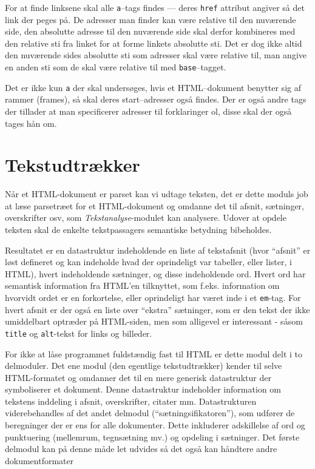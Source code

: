\documentclass[a4paper,oneside,article, titlepage]{memoir}
\begin{document}
For at finde linksene skal alle \texttt{a}--tags findes --- deres
\texttt{href} attribut angiver så det link der peges på. De adresser
man finder kan være relative til den nuværende side, den absolutte
adresse til den nuværende side skal derfor kombineres med den relative
sti fra linket for at forme linkets absolutte sti. Det er dog ikke
altid den nuværende sides absolutte sti som adresser skal være
relative til, man angive en anden sti som de skal være relative til
med \texttt{base}--tagget. 

Det er ikke kun \texttt{a} der skal undersøges, hvis et HTML--dokument
benytter sig af rammer (frames), så skal deres start--adresser også
findes. Der er også andre tags der tillader at man specificerer
adresser til forklaringer ol, disse skal der også tages hån om.

\section{Tekstudtrækker}
Når et HTML-dokument er parset kan vi udtage teksten, det er dette
moduls job at læse parsetræet for et HTML-dokument og omdanne det til
afsnit, sætninger, overskrifter osv, som \textit{Tekstanalyse}-modulet
kan analysere. Udover at opdele teksten skal de enkelte tekstpassagers
semantiske betydning bibeholdes.

Resultatet er en datastruktur indeholdende en liste af tekstafsnit
(hvor ``afsnit'' er løst defineret og kan indeholde hvad der
oprindeligt var tabeller, eller lister, i HTML), hvert indeholdende
sætninger, og disse indeholdende ord. Hvert ord har semantisk
information fra HTML'en tilknyttet, som f.eks. information om hvorvidt
ordet er en forkortelse, eller oprindeligt har været inde i et
\texttt{em}-tag. For hvert afsnit er der også en liste over ``ekstra''
sætninger, som er den tekst der ikke umiddelbart optræder på
HTML-siden, men som alligevel er interessant - såsom \texttt{title} og
\texttt{alt}-tekst for links og billeder.

For ikke at låse programmet fuldstændig fast til HTML er dette modul
delt i to delmoduler. Det ene modul (den egentlige tekstudtrækker)
kender til selve HTML-formatet og omdanner det til en mere generisk
datastruktur der symboliserer et dokument. Denne datastruktur
indeholder information om tekstens inddeling i afsnit, overskrifter,
citater mm. Datastrukturen viderebehandles af det andet delmodul
(``sætningsifikatoren''), som udfører de beregninger der er ens for
alle dokumenter. Dette inkluderer adskillelse af ord og punktuering
(mellemrum, tegnsætning mv.) og opdeling i sætninger.  Det første
delmodul kan på denne måde let udvides så det også kan håndtere andre
dokumentformater
\end{document}
